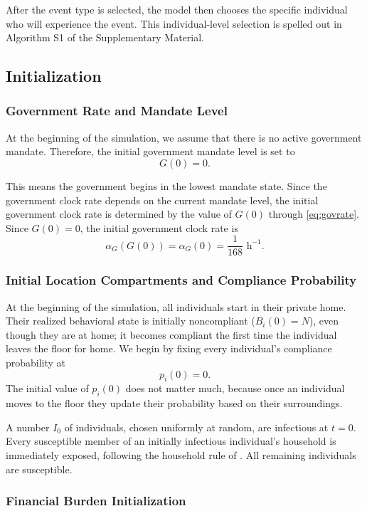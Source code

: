 \documentclass[11pt]{article}
\theoremstyle{definition}
\theoremstyle{plain}
\begin{document}
After the event type is selected, the model then chooses the specific individual who will
experience the event. This individual-level selection is spelled out in Algorithm S1 of the Supplementary Material.

\subsection{Initialization}
\label{sec:init}
\subsubsection{Government Rate and Mandate Level}

At the beginning of the simulation, we assume that there is no active government mandate.
Therefore, the initial government mandate level is set to
\[
G(0)=0.
\]

This means the government begins in the lowest mandate state. Since the government clock
rate depends on the current mandate level, the initial government clock rate is determined
by the value of $G(0)$ through \eqref{eq:govrate}. Since $G(0)=0$, the initial government clock rate is
\[
\alpha_G(G(0))=\alpha_G(0)=\frac{1}{168}\text{ h}^{-1}.
\]


\subsubsection{Initial Location Compartments and Compliance Probability}

At the beginning of the simulation, all individuals start in their private home. Their realized behavioral state is initially noncompliant ($B_i(0)=N$), even though they are at home; it becomes compliant the first time the individual leaves the floor for home. We begin by fixing every individual's compliance probability at
\[
p_i(0) = 0.
\]
The initial value of $p_i(0)$ does not matter much, because once an individual moves to the floor they update their probability based on their surroundings.

A number $I_0$ of individuals, chosen uniformly at random, are infectious at $t=0$. Every susceptible member of an initially infectious individual's household is immediately exposed, following the household rule of . All remaining individuals are susceptible.

\subsubsection{Financial Burden Initialization}
\end{document}
